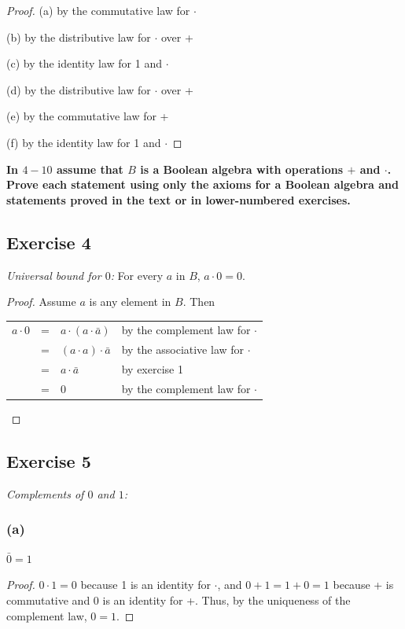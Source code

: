 \documentclass[14pt]{extarticle}
\newcommand{\cy}{\color{cyan}}
\begin{document}
\begin{proof}
{\cy (a)} by the commutative law for $\cdot$

{\cy (b)} by the distributive law for $\cdot$ over +

{\cy (c)} by the identity law for 1 and $\cdot$

{\cy (d)} by the distributive law for $\cdot$ over +

{\cy (e)} by the commutative law for +

{\cy (f)} by the identity law for 1 and $\cdot$
\end{proof}

{\bf \cy In $4-10$ assume that $B$ is a Boolean algebra with operations $+$ and $\cdot$. Prove each statement using 
only the axioms for a Boolean algebra and statements proved in the text or in lower-numbered exercises.}

\subsection{Exercise 4}
{\it Universal bound for $0$:} For every $a$ in $B$, \(a \cdot 0 = 0\).

\begin{proof}
Assume $a$ is any element in $B$. Then
\begin{center}
\begin{tabular}{rcll}
\(a \cdot 0\) & = & \(a \cdot (a \cdot \bar{a})\) & {\cy by the complement law for $\cdot$} \\
& = & \((a \cdot a) \cdot \bar{a}\) & {\cy by the associative law for $\cdot$} \\
& = & \(a \cdot \bar{a}\) & {\cy by exercise 1} \\
& = & 0 & {\cy by the complement law for $\cdot$} \\
\end{tabular}
\end{center}
\end{proof}

\subsection{Exercise 5}
{\it Complements of $0$ and $1$:}

\subsubsection{(a)}
\(\bar{0} = 1\)

\begin{proof}
$0 \cdot 1 = 0$ because 1 is an identity for $\cdot$, and $0 + 1 = 1 + 0 = 1$ because + is commutative and 0 is an 
identity for +. Thus, by the uniqueness of the complement law, $0 = 1$.
\end{proof}
\end{document}
